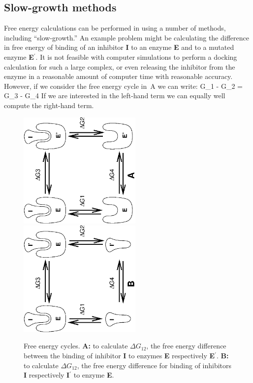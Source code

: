 \subsection{Slow-growth methods}
Free energy calculations can be performed
in {\gromacs} using  a number of methods, including ``slow-growth.'' An example problem 
might be calculating the difference in free energy of binding of an inhibitor {\bf I}
to an enzyme {\bf E} and to a mutated enzyme {\bf E$^{\prime}$}. It 
is not feasible with computer simulations to perform a docking
calculation for such a large complex, or even releasing the inhibitor from
the enzyme in a reasonable amount of computer time with reasonable accuracy.
However, if we consider the free energy cycle in~A
we can write:
\beq
\Delta G_1 - \Delta G_2 =       \Delta G_3 - \Delta G_4
\label{eqn:ddg}
\eeq
If we are interested in the left-hand term we can equally well compute
the right-hand term.
\begin{figure}
\centerline{\includegraphics[width=6cm,angle=270]{plots/free1}\hspace{2cm}\includegraphics[width=6cm,angle=270]{plots/free2}}
\caption[Free energy cycles.]{Free energy cycles. {\bf A:} to
calculate $\Delta G_{12}$, the free energy difference between the
binding of inhibitor {\bf I} to enzymes {\bf E} respectively {\bf
E$^{\prime}$}. {\bf B:} to calculate $\Delta G_{12}$, the free energy
difference for binding of inhibitors {\bf I} respectively {\bf I$^{\prime}$} to
enzyme {\bf E}.}
\label{fig:free}
\end{figure}

